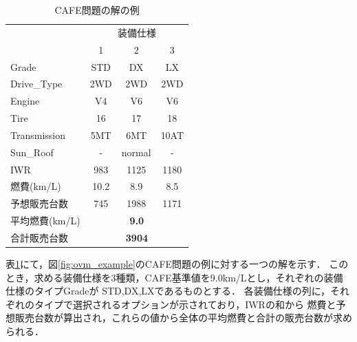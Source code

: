 \begin{table}[tb]
 \caption{CAFE問題の解の例}
 \begin{tabular}{l|c|c|c} \bhline
    \multicolumn{1}{c|}{装備}   & \multicolumn{3}{c}{装備仕様} \\ \cline{2-4}
                 & 1	& 2 	 & 3	\\  \hline
    Grade	 & STD	& DX	 & LX	\\
    Drive\_Type  & 2WD  & 2WD    & 2WD  \\
    Engine	 & V4	& V6	 & V6	\\
    Tire	 & 16	& 17	 & 18	\\
    Transmission & 5MT	& 6MT    & 10AT	\\
    Sun\_Roof    & -    & normal & -    \\ \hline
    IWR          & 983  & 1125   & 1180 \\ %
    燃費(km/L)    & 10.2  & 8.9     & 8.5 \\ %
    予想販売台数  & 745  & 1988   & 1171  \\ \hline
    平均燃費(km/L) & \multicolumn{3}{c}{\bf{9.0}} \\ 
    合計販売台数  & \multicolumn{3}{c}{\bf{3904}} \\ \hline
 \end{tabular}
 \label{tab:ovm_ans}
\end{table}

表\ref{tab:ovm_ans}にて，図\ref{fig:ovm_example}のCAFE問題の例に対する一つの解を示す．
このとき，求める装備仕様を3種類，CAFE基準値を9.0km/Lとし，それぞれの装備仕様のタイプGradeが
STD,DX,LXであるものとする．
各装備仕様の列に，それぞれのタイプで選択されるオプションが示されており，IWRの和から
燃費と予想販売台数が算出され，これらの値から全体の平均燃費と合計の販売台数が求められる．






